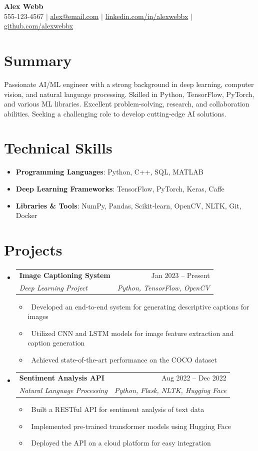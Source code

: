 \documentclass[letterpaper,10pt]{article}
\makeatletter
\newcommand{\resumeItem}[1]{\item\small{#1}}
\newcommand{\resumeSubheading}[4]{
\vspace{-1pt}\item
  \begin{tabular*}{0.97\textwidth}[t]{l@{\extracolsep{\fill}}r}
    \textbf{#1} & #2 \\
    \textit{#3} & \textit{#4} \\
  \end{tabular*}\vspace{-7pt}
}
\newcommand{\resumeSubHeadingList}{\begin{itemize}[leftmargin=0.15in, label={}]}
\newcommand{\resumeSubHeadingListEnd}{\end{itemize}}
\makeatother
\begin{document}
\begin{center}
  \textbf{\Huge Alex Webb} \\
  \small 555-123-4567 $|$ \href{mailto:alex@email.com}{alex@email.com} $|$
  \href{https://linkedin.com/in/burhan-webb}{linkedin.com/in/alexwebbx} $|$
  \href{https://github.com/zwayth}{github.com/alexwebbx}
\end{center}

\section*{Summary}
Passionate AI/ML engineer with a strong background in deep learning, computer vision, and natural language processing. Skilled in Python, TensorFlow, PyTorch, and various ML libraries. Excellent problem-solving, research, and collaboration abilities. Seeking a challenging role to develop cutting-edge AI solutions.

\section{Technical Skills}
\resumeSubHeadingList
  \resumeItem{\textbf{Programming Languages}: Python, C++, SQL, MATLAB}
  \resumeItem{\textbf{Deep Learning Frameworks}: TensorFlow, PyTorch, Keras, Caffe}
  \resumeItem{\textbf{Libraries \& Tools}: NumPy, Pandas, Scikit-learn, OpenCV, NLTK, Git, Docker}
\resumeSubHeadingListEnd

\section{Projects}
\resumeSubHeadingList
  \resumeSubheading
      {Image Captioning System}{Jan 2023 -- Present}
      {Deep Learning Project}{Python, TensorFlow, OpenCV}
      \resumeSubHeadingList
          \resumeItem{\textbullet\ Developed an end-to-end system for generating descriptive captions for images}
          \resumeItem{\textbullet\ Utilized CNN and LSTM models for image feature extraction and caption generation}
          \resumeItem{\textbullet\ Achieved state-of-the-art performance on the COCO dataset}
      \resumeSubHeadingListEnd
  \resumeSubheading
      {Sentiment Analysis API}{Aug 2022 -- Dec 2022}
      {Natural Language Processing}{Python, Flask, NLTK, Hugging Face}
      \resumeSubHeadingList
          \resumeItem{\textbullet\ Built a RESTful API for sentiment analysis of text data}
          \resumeItem{\textbullet\ Implemented pre-trained transformer models using Hugging Face}
          \resumeItem{\textbullet\ Deployed the API on a cloud platform for easy integration}
      \resumeSubHeadingListEnd
\resumeSubHeadingListEnd
\end{document}

